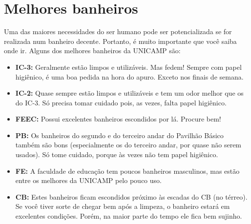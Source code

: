 \section{Melhores banheiros}

Uma das maiores necessidades do ser humano pode ser potencializada se for
realizada num banheiro decente. Portanto, é muito importante que você saiba onde
ir. Alguns dos melhores banheiros da UNICAMP são:

\begin{itemize}
\item  \textbf{IC-3:} Geralmente estão limpos e utilizáveis. Mas fedem! Sempre com papel higiênico, é uma boa pedida na hora do apuro. Exceto nos finais de semana.
\end{itemize}

\begin{itemize}
\item  \textbf{IC-2:} Quase sempre estão limpos e utilizáveis e tem um odor melhor que os do IC-3. Só precisa tomar cuidado pois, as vezes, falta papel higiênico.
\end{itemize}

\begin{itemize}
\item  \textbf{FEEC:} Possui excelentes banheiros escondidos por lá. Procure bem!
\end{itemize}

\begin{itemize}
\item  \textbf{PB:} Os banheiros do segundo e do terceiro andar do Pavilhão Básico também são bons (especialmente os do terceiro andar, por quase não serem usados). Só tome cuidado, porque às vezes não tem papel higiênico.
\end{itemize}

\begin{itemize}
\item  \textbf{FE:} A faculdade de educação tem poucos banheiros masculinos, mas estão entre os melhores da UNICAMP pelo pouco uso.
\end{itemize}

\begin{itemize}
\item  \textbf{CB:} Estes banheiros ficam escondidos próximo às escadas do CB (no térreo). Se você tiver sorte de chegar bem após a limpeza, o banheiro estará em excelentes condições. Porém, na maior parte do tempo ele fica bem sujinho.
\end{itemize}

